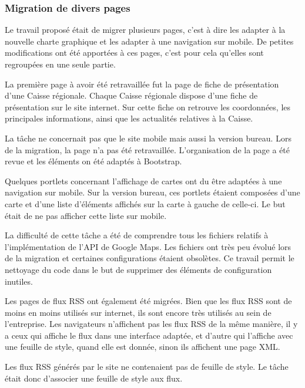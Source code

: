 \documentclass[12pt,a4paper]{article}
\begin{document}
\subsubsection{Migration de divers pages}
Le travail proposé était de migrer plusieurs pages, c'est à dire les adapter à la nouvelle charte graphique et les adapter à une navigation sur mobile. De petites modifications ont été apportées à ces pages, c'est pour cela qu'elles sont regroupées en une seule partie.\par 
\bigskip
La première page à avoir été retravaillée fut la page de fiche de présentation d'une Caisse régionale. Chaque Caisse régionale dispose d'une fiche de présentation sur le site internet. Sur cette fiche on retrouve les coordonnées, les principales informations, ainsi que les actualités relatives à la Caisse.\par 
La tâche ne concernait pas que le site mobile mais aussi la version bureau. Lors de la migration, la page n'a pas été retravaillée. L'organisation de la page a été revue et les éléments on été adaptés à Bootstrap.\par 
\bigskip
Quelques portlets concernant l'affichage de cartes ont du être adaptées à une navigation sur mobile. Sur la version bureau, ces portlets étaient composées d'une carte et d'une liste d'éléments affichés sur la carte à gauche de celle-ci. Le but était de ne pas afficher cette liste sur mobile.\par 
La difficulté de cette tâche a été de comprendre tous les fichiers relatifs à l'implémentation de l'API de Google Maps. Les fichiers ont très peu évolué lors de la migration et certaines configurations étaient obsolètes. Ce travail permit le nettoyage du code dans le but de supprimer des éléments de configuration inutiles.\par
\bigskip
Les pages de flux RSS ont également été migrées. Bien que les flux RSS sont de moins en moins utilisés sur internet, ils sont encore très utilisés au sein de l'entreprise. Les navigateurs n'affichent pas les flux RSS de la même manière, il y a ceux qui affiche le flux dans une interface adaptée, et d'autre qui l'affiche avec une feuille de style, quand elle est donnée, sinon ils affichent une page XML.\par 
Les flux RSS générés par le site ne contenaient pas de feuille de style. Le tâche était donc d'associer une feuille de style aux flux.\par
\end{document}
